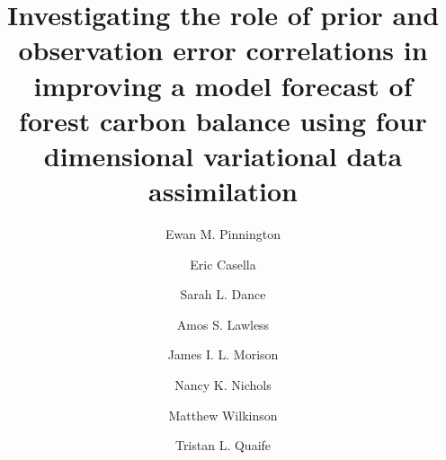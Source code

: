 \documentclass[review]{elsarticle}
\begin{document}
\begin{frontmatter}

\title{Investigating the role of prior and observation error correlations in improving a model forecast of forest carbon balance using four dimensional variational data assimilation}


\author[address1]{Ewan M. Pinnington}

\author[address3]{Eric Casella}

\author[address1,address2]{Sarah L. Dance}

\author[address1,address2,address4]{Amos S. Lawless}

\author[address3]{James I. L. Morison}

\author[address1,address2,address4]{Nancy K. Nichols}

\author[address3]{Matthew Wilkinson}

\author[address1,address4]{Tristan L. Quaife}


\address[address1]{Department of Meteorology, University of Reading, Reading, UK}
\address[address2]{Department of Mathematics and Statistics, University of Reading, Reading, UK}
\address[address3]{Centre for Sustainable Forestry and Climate Change, Forest Research, Alice Holt, Farnham, UK}
\address[address4]{National Centre for Earth Observation, University of Reading, Reading, UK}



\end{frontmatter}
\end{document}
